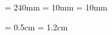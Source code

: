 \documentclass[11pt,a4paper,oneside]{article} %
\begin{document}
        \textheight = 240mm
        \footskip = 10mm
        \leftskip = 10mm

        

        \headheight = 0.5cm
        \headsep = 1.2cm

        
        
\end{document}
